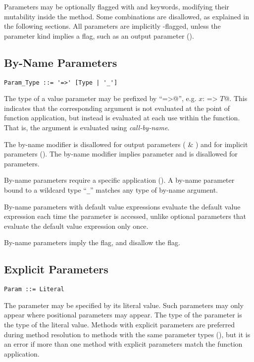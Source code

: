 Parameters may be optionally flagged with  and  keywords, modifying their mutability inside the method. Some combinations are disallowed, as explained in the following sections. All parameters are implicitly -flagged, unless the parameter kind implies a  flag, such as an output parameter ().

\subsection{By-Name Parameters}
\label{sec:by-name-parameters}

\syntax\begin{lstlisting}
Param_Type ::= '=>' [Type | '_']
\end{lstlisting}

The type of a value parameter may be prefixed by ``\lstinline@=>@'', e.g. \lstinline@$x$: => $T$@. This indicates that the corresponding argument is not evaluated at the point of function application, but instead is evaluated at each use within the function. That is, the argument is evaluated using {\em call-by-name}. 

The by-name modifier is disallowed for output parameters ( \& ) and for implicit parameters (). The by-name modifier implies  parameter and is disallowed for  parameters. 

By-name parameters require a specific application (). A by-name parameter bound to a wildcard type ``\lstinline!_!'' matches any type of by-name argument. 

By-name parameters with default value expressions evaluate the default value expression each time the parameter is accessed, unlike optional parameters that evaluate the default value expression only once. 

By-name parameters imply the  flag, and disallow the  flag. 

\subsection{Explicit Parameters}
\label{sec:explicit-parameters}

\syntax\begin{lstlisting}
Param ::= Literal
\end{lstlisting}

The parameter may be specified by its literal value. Such parameters may only appear where positional parameters may appear. The type of the parameter is the type of the literal value. Methods with explicit parameters are preferred during method resolution to methods with the same parameter types (), but it is an error if more than one method with explicit parameters match the function application. 

